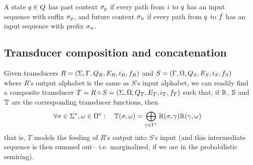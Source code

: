 \documentclass[english]{article}
\begin{document}
A state $q \in Q$ has past context $\sigma_p$ if every path from $i$ to $q$ has an input sequence with suffix $\sigma_p$,
and future context $\sigma_n$ if every path from $q$ to $f$ has an input sequence with prefix $\sigma_n$.

\subsection*{Transducer composition and concatenation}

Given transducers
 $R = (\Sigma, \Gamma, Q_R, E_R, i_R, f_R)$ and
 $S = (\Gamma, \Omega, Q_S, E_S, i_S, f_S)$
where $R$'s output alphabet is the same as $S$'s input alphabet,
we can readily find a composite transducer
 $T = R \circ S = (\Sigma, \Omega, Q_T, E_T, i_T, f_T)$
such that, if $\mathbb{R}$, $\mathbb{S}$ and $\mathbb{T}$ are the corresponding transducer functions,
then
\[
\forall \sigma \in {\Sigma}^{\ast}, \omega \in {\Omega}^{\ast}:
\quad
\mathbb{T}(\sigma,\omega) = \bigoplus_{\gamma \in {\Gamma}^{\ast}} \mathbb{R}(\sigma,\gamma) \mathbb{R}(\gamma,\omega)
\]
that is, $T$ models the feeding of $R$'s output into $S$'s input
(and this intermediate sequence is then summed out---i.e. marginalized, if we are in the probabilistic semiring).
\end{document}
